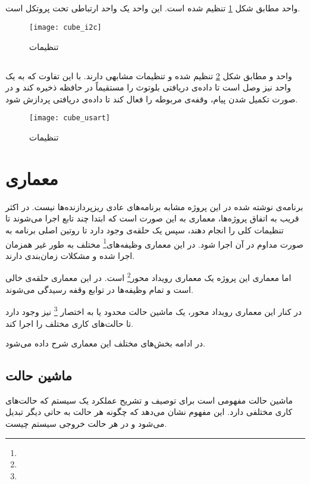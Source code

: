 \subsection{}
واحد  مطابق شکل \ref{fig:cube-i2c} تنظیم شده است. این واحد یک واحد ارتباطی تحت پروتکل  است.

	\begin{figure}[h]
		\centering
		\texttt{[image: cube\_i2c]}
		\caption{تنظیمات }
		\label{fig:cube-i2c}
	\end{figure}

\subsection{}
واحد  و  مطابق شکل \ref{fig:cube-usart} تنظیم شده و تنظیمات مشابهی دارند. با این تفاوت که  به یک واحد  نیز وصل است تا داده‌ی دریافتی بلوتوث را مستقیماً در حافظه ذخیره کند و در صورت تکمیل شدن پیام، وقفه‌ی مربوطه را فعال کند تا داده‌ی دریافتی پردازش شود.

	\begin{figure}[h]
		\centering
		\texttt{[image: cube\_usart]}
		\caption{تنظیمات }
		\label{fig:cube-usart}
	\end{figure}



\section{معماری}
برنامه‌ی نوشته شده در این پروژه مشابه برنامه‌های عادی ریزپردازنده‌ها نیست. در اکثر قریب به اتفاق پروژه‌ها، معماری به این صورت است که ابتدا چند تابع اجرا می‌شوند تا تنظیمات کلی را انجام دهند، سپس یک حلقه‌ی  وجود دارد تا روتین اصلی برنامه به صورت مداوم در آن اجرا شود. در این معماری وظیفه‌های\footnote{}
مختلف به طور غیر همزمان اجرا شده و مشکلات زمان‌بندی دارند.

اما معماری این پروژه یک معماری رویداد محور\footnote{}
است. در این معماری حلقه‌ی  خالی است و تمام وظیفه‌ها در توابع وقفه رسیدگی می‌شوند.

در کنار این معماری رویداد محور، یک ماشین حالت محدود یا به اختصار
\footnote{}
نیز وجود دارد تا حالت‌های کاری مختلف را اجرا کند.

در ادامه بخش‌های مختلف این معماری شرح داده می‌شود.
\subsection{ماشین حالت} \label{sec:fsm}
ماشین حالت مفهومی است برای توصیف و تشریح عملکرد یک سیستم که حالت‌های کاری مختلفی دارد. این مفهوم نشان می‌دهد که چگونه هر حالت به حاتی دیگر تبدیل می‌شود و در هر حالت خروجی سیستم چیست.

